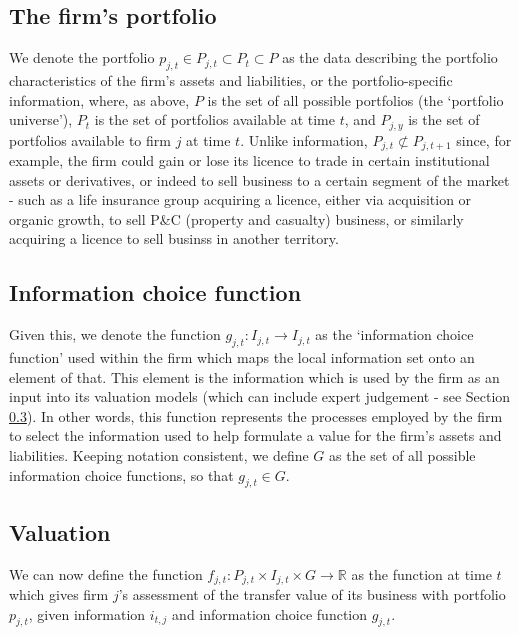 \subsection{The firm's portfolio} \label{section:portfolio}
We denote the portfolio $p_{j,t} \in P_{j,t} \subset P_t \subset P$ as the data
describing the portfolio characteristics of the firm's assets and liabilities,
or the portfolio-specific information, where, as above, $P$ is the set of all
possible portfolios (the `portfolio universe'), $P_t$ is the set of portfolios
available at time $t$, and $P_{j,y}$ is the set of portfolios available to firm
$j$ at time $t$. Unlike information, $P_{j,t} \not \subset P_{j,t+1}$ since,
for example, the firm could gain or lose its licence to trade in certain
institutional assets or derivatives, or indeed to sell business to a certain
segment of the market - such as a life insurance group acquiring a licence,
either via acquisition or organic growth, to sell P\&C (property and casualty)
business, or similarly acquiring a licence to sell businss in another
territory.

\subsection{Information choice function}
\label{section:information_choice_function}
Given this, we denote the function $g_{j,t}:I_{j,t} \rightarrow I_{j,t}$ as the
`information choice function' used within the firm which maps the local
information set onto an element of that. This element is the information which
is used by the firm as an input into its valuation models (which can include
expert judgement - see Section \ref{section:valuation}). In other words, this
function represents the processes employed by the firm to select the
information used to help formulate a value for the firm's assets and
liabilities. Keeping notation consistent, we define $G$ as the set of all
possible information choice functions, so that $ g_{j,t} \in G $.

\subsection{Valuation} \label{section:valuation}
We can now define the function $f_{j,t}:P_{j,t} \times I_{j,t} \times G
\rightarrow\mathbb{R}$ as the function at time $t$ which gives firm $j$'s
assessment of the transfer value of its business with portfolio $p_{j,t}$,
given information $i_{t,j}$ and information choice function $g_{j,t}$.

